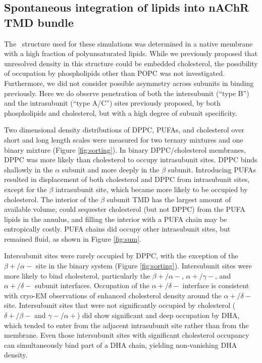 	\subsection{Spontaneous integration of lipids into nAChR TMD bundle} \label{Embed}

	The \nachr~structure used for these simulations was determined in a native membrane with a high fraction of polyunsaturated lipids. While we previously \citep{Brannigan2008} proposed that unresolved density in this structure could be embedded cholesterol, the possibility of occupation by phospholipids other than POPC was not investigated.  Furthermore, we did not consider possible asymmetry across subunits in binding previously.  Here we do observe penetration of both the intersubunit (``type B'') and the intrasubunit (``type A/C'') sites previously proposed\citep{Brannigan2008}, by both phospholipids and cholesterol, but with a high degree of subunit specificity.  
		
Two dimensional density distributions of DPPC, PUFAs, and cholesterol over short and long length scales were measured for two ternary mixtures and one binary mixture (Figure \ref{fig:sorting}).   In binary DPPC/cholesterol membranes, DPPC was more likely than cholesterol to occupy intrasubunit sites.  DPPC binds shallowly in the $\alpha$ subunit and more deeply in the $\beta$ subunit. Introducing PUFAs resulted in displacement of both cholesterol and DPPC from intrasubunit sites, except for the $\beta$ intrasubunit site, which became more likely to be occupied by cholesterol. The interior of the $\beta$ subunit TMD has the largest amount of available volume, could sequester cholesterol (but not DPPC) from the PUFA lipids in the annulus, and filling the interior with a PUFA chain may be entropically costly.  PUFA chains did occupy other intrasubunit sites, but remained fluid, as shown in Figure \ref{fig:sum}. 

	Intersubunit sites were rarely occupied by DPPC, with the exception of the $\beta+/\alpha-$ site in the binary system (Figure \ref{fig:sorting}). Intersubunit sites were more likely to bind cholesterol, particularly the $\beta+/\alpha-$, $\alpha+/\gamma-$, and $\alpha+/\delta-$ subunit interfaces. Occupation of the $\alpha+/\delta-$ interface is consistent with cryo-EM observations\citep{Unwin2017}  of enhanced cholesterol density around the $\alpha+/\delta-$ site. Intersubunit sites that were not significantly occupied by cholesterol ($\delta+/\beta-$ and $\gamma-/\alpha+$) did show significant and deep occupation by DHA, which tended to enter from the adjacent intrasubunit site rather than from the membrane. Even those intersubunit sites with significant cholesterol occupancy can simultaneously bind part of a DHA chain, yielding non-vanishing DHA density.  

